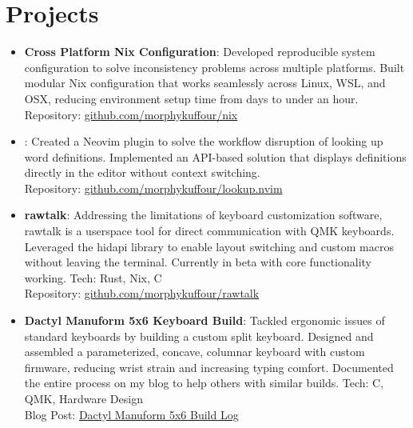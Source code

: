 \documentclass[a4paper,11pt]{article}
\newcommand{\resumeItem}[2]{
  \item\small{
    \textbf{#1}{: #2 \vspace{-2pt}}
  }
}
\newcommand{\resumeSubItem}[2]{\resumeItem{#1}{#2}\vspace{-3pt}}
\begin{document}
\section{Projects}
\vspace{5pt}
\begin{itemize}[leftmargin=0pt, label={}]  %
\resumeSubItem{\textbf{Cross Platform Nix Configuration}}{Developed reproducible system configuration to solve inconsistency problems across multiple platforms. Built modular Nix configuration that works seamlessly across Linux, WSL, and OSX, reducing environment setup time from days to under an hour. \\Repository: \href{https://github.com/morphykuffour/nix.git}{github.com/morphykuffour/nix}}
\vspace{2pt}

\resumeSubItem{}{Created a Neovim plugin to solve the workflow disruption of looking up word definitions. Implemented an API-based solution that displays definitions directly in the editor without context switching. \\Repository: \href{https://github.com/morphykuffour/lookup.nvim}{github.com/morphykuffour/lookup.nvim}}
\vspace{2pt}

\resumeSubItem{\textbf{rawtalk}}{Addressing the limitations of keyboard customization software, rawtalk is a userspace tool for direct communication with QMK keyboards. Leveraged the hidapi library to enable layout switching and custom macros without leaving the terminal. Currently in beta with core functionality working. Tech: Rust, Nix, C \\Repository: \href{https://github.com/morphykuffour/rawtalk.git}{github.com/morphykuffour/rawtalk}}
\vspace{2pt}

\resumeSubItem{\textbf{Dactyl Manuform 5x6 Keyboard Build}}{Tackled ergonomic issues of standard keyboards by building a custom split keyboard. Designed and assembled a parameterized, concave, columnar keyboard with custom firmware, reducing wrist strain and increasing typing comfort. Documented the entire process on my blog to help others with similar builds. Tech: C, QMK, Hardware Design \\Blog Post: \href{https://morphykuffour.github.io/keyboards,/ergonomics,/qmk/2021/12/29/Dactyl-Manuform.html}{Dactyl Manuform 5x6 Build Log}}
\vspace{2pt}
\end{itemize}
\end{document}
